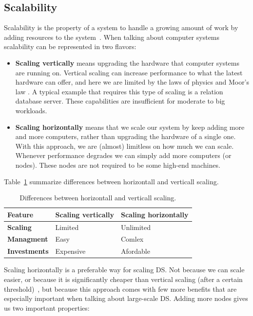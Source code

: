 \subsection{Scalability}\label{sec:scalability}
%
Scalability is the property of a system to handle a growing amount of work by adding resources to the system~\cite{Bondi00}. When talking about computer systems scalability can be represented in two flavors:

\begin{itemize}
	\item \textbf{Scaling vertically} means upgrading the hardware that computer systems are running on. Vertical scaling can increase performance to what the latest hardware can offer, and here we are limited by the laws of physics and Moor's law \cite{Gustafson2011}. A typical example that requires this type of scaling is a relation database server. These capabilities are insufficient for moderate to big workloads.
	\item \textbf{Scaling horizontally} means that we scale our system by keep adding more and more computers, rather than upgrading the hardware of a single one. With this approach, we are (almost) limitless on how much we can scale. Whenever performance degrades we can simply add more computers (or nodes). These nodes are not required to be some high-end machines.
\end{itemize}

\noindent
Table~\ref{tab:table1} summarize differences between horizontall and verticall scaling.

\begin{table}[h!]
	\begin{center}
		\begin{tabular}{l|l|l}
			\textbf{Feature} & \textbf{Scaling vertically} & \textbf{Scaling horizontally}\\
			\hline
			\textbf{Scaling} & Limited & Unlimited \\
			\textbf{Managment} & Easy & Comlex\\
			\textbf{Investments} & Expensive & Afordable \\
		\end{tabular}
	\end{center}
	\vspace{-0.5cm}
	\caption{Differences between horizontall and verticall scaling.}
	\label{tab:table1}
\end{table}

\noindent
Scaling horizontally is a preferable way for scaling DS. Not because we can scale easier, or because it is significantly cheaper than vertical scaling (after a certain threshold)~\cite{Bondi00}, but because this approach comes with few more benefits that are especially important when talking about large-scale DS. Adding more nodes gives us two important properties: 

